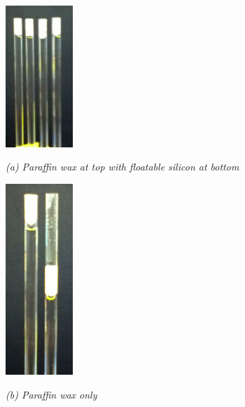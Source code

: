 \begin{figure}[htb]
  \begin{minipage}[t]{1in}
    \centering
    \centerline{\mbox{\includegraphics[width=1in]{phantom/images/tube_sealings/paraffin_and_floable_silicon.eps}}}
    \centerline{\emph{(a) Paraffin wax at top with floatable silicon at bottom}}
  \end{minipage}
  \begin{minipage}[t]{1in}
    \centering
    \centerline{\mbox{\includegraphics[width=1in]{phantom/images/tube_sealings/paraffin.eps}}}
    \centerline{\emph{(b) Paraffin wax only}}
  \end{minipage}


\end{figure}
